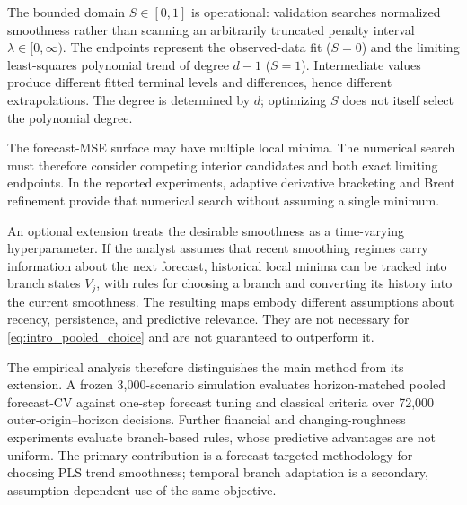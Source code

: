 The bounded domain $S\in[0,1]$ is operational: validation searches
normalized smoothness rather than scanning an arbitrarily truncated
penalty interval $\lambda\in[0,\infty)$. The endpoints represent the
observed-data fit ($S=0$) and the limiting least-squares polynomial
trend of degree $d-1$ ($S=1$). Intermediate values produce different
fitted terminal levels and differences, hence different extrapolations.
The degree is determined by $d$; optimizing $S$ does not itself
select the polynomial degree.

The forecast-MSE surface may have multiple local minima. The
numerical search must therefore consider competing interior
candidates and both exact limiting endpoints. In the reported
experiments, adaptive derivative bracketing and Brent refinement
provide that numerical search without assuming a single minimum.

An optional extension treats the desirable smoothness as a
time-varying hyperparameter. If the analyst assumes that
recent smoothing regimes carry information about the next
forecast, historical local minima can be tracked into
branch states $V_j$, with rules for choosing a branch and
converting its history into the current smoothness.
The resulting maps embody different assumptions about
recency, persistence, and predictive relevance. They are
not necessary for \cref{eq:intro_pooled_choice} and are
not guaranteed to outperform it.

The empirical analysis therefore distinguishes the main
method from its extension. A frozen 3,000-scenario simulation
evaluates horizon-matched pooled forecast-CV against one-step
forecast tuning and classical criteria over 72,000
outer-origin--horizon decisions. Further financial and
changing-roughness experiments evaluate branch-based rules,
whose predictive advantages are not uniform. The primary
contribution is a forecast-targeted methodology for choosing
PLS trend smoothness; temporal branch adaptation is a
secondary, assumption-dependent use of the same objective.
